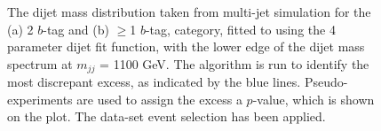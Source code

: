 \begin{figure}[!ht]
  \begin{center}
   \captionsetup[subfigure]{aboveskip=0pt,justification=centering}
  \end{center}
  \caption{ The dijet mass distribution taken from multi-jet simulation for the (a) 2 $b$-tag and (b) $\geq$1 $b$-tag,
   category, fitted to using the 4 parameter dijet fit function, with the lower edge of the dijet mass spectrum at $m_{jj}$ = 1100 GeV.
   The \bh{} algorithm is run to identify the most discrepant excess, as indicated by the blue lines.
   Pseudo-experiments are used to assign the excess a \mbox{$p$-value}, which is shown on the plot.    
   The \summer{} data-set event selection has been applied.}
 \label{fig:Short_4para_1100_figure1}
\end{figure}
%
%

